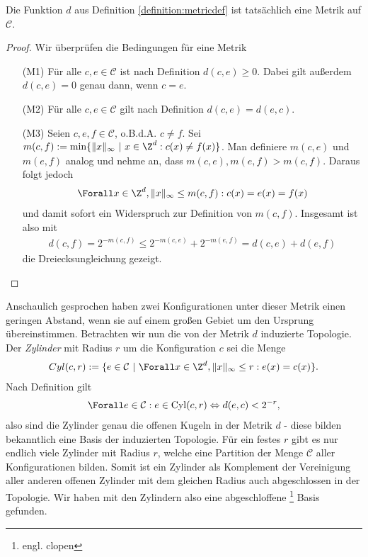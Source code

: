\begin{lemma}
  Die Funktion $d$ aus Definition \ref{definition:metricdef} ist tatsächlich eine Metrik auf $\mathcal{C}$.
\end{lemma}
\begin{proof}
  Wir überprüfen die Bedingungen für eine Metrik
  \begin{itemize}
    \item[(M1)] Für alle $c,e \in \mathcal{C}$ ist nach Definition $d(c,e) \geq 0$. Dabei gilt außerdem $d(c,e) = 0$ genau dann, wenn $c = e$.

    \item[(M2)] Für alle $c,e \in \mathcal{C}$ gilt nach Definition $d(c,e) = d(e,c)$.

    \item[(M3)] Seien $c,e,f \in \mathcal{C}$, o.B.d.A. $c \neq f$. Sei $m(c,f) := \min \{ \|x\|_\infty \text{~}| \text{~}x \in \Z^d: c(x) \neq f(x)\}$. Man definiere $m(c,e)$ und $m(e,f)$ analog und nehme an, dass $m(c,e), m(e,f) > m(c,f)$. Daraus folgt jedoch
    \begin{align*}
      \Forall x \in \Z^d, \|x\|_{\infty} \leq m(c,f): c(x) = e(x) = f(x)
    \end{align*}
    und damit sofort ein Widerspruch zur Definition von $m(c,f)$.
    Insgesamt ist also mit
    \begin{align*}
      d(c,f) = 2^{-m(c,f)} \leq 2^{-m(c,e)} + 2^{-m(e,f)} = d(c,e) + d(e,f)
    \end{align*}
    die Dreiecksungleichung gezeigt.

  \end{itemize}

\end{proof}

Anschaulich gesprochen haben zwei Konfigurationen unter dieser Metrik einen geringen Abstand, wenn sie auf einem großen Gebiet um den Ursprung übereinstimmen. Betrachten wir nun die von der Metrik $d$ induzierte Topologie. Der \textit{Zylinder} mit Radius $r$ um die Konfiguration $c$ sei die Menge
\begin{align*}
  Cyl(c,r) := \{e \in \mathcal{C} \text{~}|\text{~}\Forall x \in \Z^d, \|x\|_\infty \leq r: e(x) = c(x) \}.
\end{align*}
Nach Definition gilt
\begin{align*}
  \Forall e \in \mathcal{C}: e \in \text{Cyl}(c,r) \Leftrightarrow d(e,c) < 2^{-r},
\end{align*}
also sind die Zylinder genau die offenen Kugeln in der Metrik $d$ - diese bilden bekanntlich eine Basis der induzierten Topologie. Für ein festes $r$ gibt es nur endlich viele Zylinder mit Radius $r$, welche eine Partition der Menge $\mathcal{C}$ aller Konfigurationen bilden. Somit ist ein Zylinder als Komplement der Vereinigung aller anderen offenen Zylinder mit dem gleichen Radius auch abgeschlossen in der Topologie. Wir haben mit den Zylindern also eine abgeschloffene \footnote{engl. clopen} Basis gefunden.

